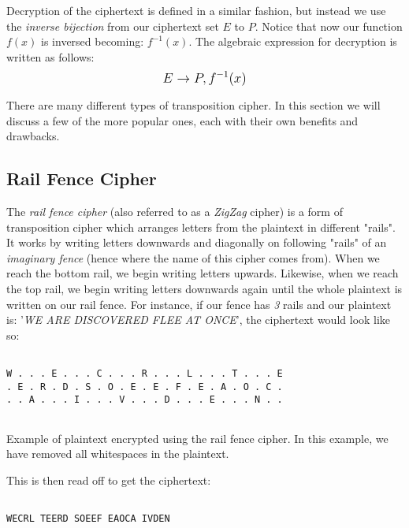 Decryption of the ciphertext is defined in a similar fashion, but instead we use the \textit{inverse bijection} from our ciphertext set $E$ to $P$. 
Notice that now our function $f(x)$ is inversed becoming: $f^{-1}(x)$. The algebraic expression for decryption is written as follows: 
$$\mathlarger{E \rightarrow P, f^{-1}(x)}$$

There are many different types of transposition cipher. In this section we will discuss a few of the more popular ones, 
each with their own benefits and drawbacks. 

\subsection{Rail Fence Cipher}

The \textit{rail fence cipher} (also referred to as a \textit{ZigZag} cipher) is a form of transposition cipher which arranges letters from
the plaintext in different "rails". It works by writing letters downwards and diagonally on following "rails" of an 
\textit{imaginary fence} (hence where the name of this cipher comes from). When we reach the bottom rail, we begin writing 
letters upwards. Likewise, when we reach the top rail, we begin writing letters downwards again until the whole plaintext is
written on our rail fence. For instance, if our fence has \textit{3} rails and our plaintext is:
'\textit{WE ARE DISCOVERED FLEE AT ONCE}', the ciphertext would look like so:

\begin{listing}[H]
    \begin{verbatim}
    
W . . . E . . . C . . . R . . . L . . . T . . . E
. E . R . D . S . O . E . E . F . E . A . O . C .
. . A . . . I . . . V . . . D . . . E . . . N . .
    
    \end{verbatim}
    \caption{Example of plaintext encrypted using the rail fence cipher. In this example, we have removed
    all whitespaces in the plaintext.}
\end{listing}

This is then read off to get the ciphertext:

\begin{verbatim}
    
WECRL TEERD SOEEF EAOCA IVDEN
\end{verbatim}

